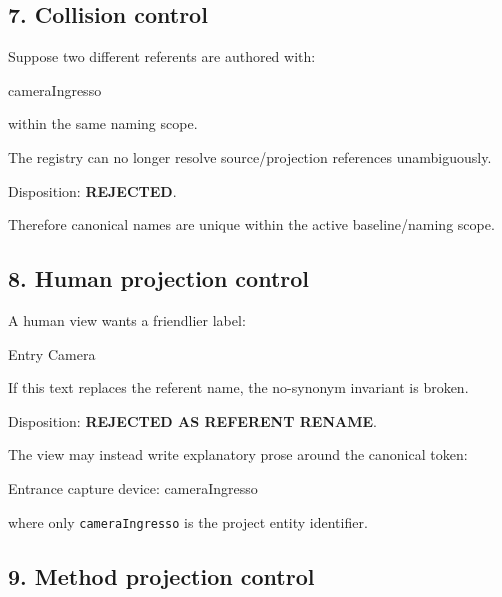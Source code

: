 \documentclass[
  10pt,
  a4paper,
]{article}
\newenvironment{Shaded}{}{}
\newcommand{\NormalTok}[1]{#1}
\begin{document}
\subsection{7. Collision control}\label{collision-control}

Suppose two different referents are authored with:

\begin{Shaded}
\begin{Highlighting}[]
\NormalTok{cameraIngresso}
\end{Highlighting}
\end{Shaded}

within the same naming scope.

The registry can no longer resolve source/projection references
unambiguously.

Disposition: \textbf{REJECTED}.

Therefore canonical names are unique within the active baseline/naming
scope.

\subsection{8. Human projection control}\label{human-projection-control}

A human view wants a friendlier label:

\begin{Shaded}
\begin{Highlighting}[]
\NormalTok{Entry Camera}
\end{Highlighting}
\end{Shaded}

If this text replaces the referent name, the no-synonym invariant is
broken.

Disposition: \textbf{REJECTED AS REFERENT RENAME}.

The view may instead write explanatory prose around the canonical token:

\begin{Shaded}
\begin{Highlighting}[]
\NormalTok{Entrance capture device: cameraIngresso}
\end{Highlighting}
\end{Shaded}

where only \texttt{cameraIngresso} is the project entity identifier.

\subsection{9. Method projection
control}\label{method-projection-control}
\end{document}

